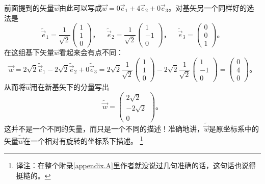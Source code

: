 前面提到的矢量$\vec{w}$由此可以写成$\vec{w}= 0\vec{e}_1 + 4\vec{e}_2 + 0\vec{e}_3$。对基矢另一个同样好的选法是
\begin{equation}
\tilde\vec{e}_1 = \frac{1}{\sqrt{2}} \begin{pmatrix}
1 \\ 1 \\ 0
\end{pmatrix}\text{，}\quad
\tilde\vec{e}_2 = \frac{1}{\sqrt{2}} \begin{pmatrix}
1 \\ -1 \\ 0
\end{pmatrix} \text{，}\quad
\tilde\vec{e}_3 = \begin{pmatrix}
0 \\ 0 \\ 1
\end{pmatrix}\text{。}
\end{equation}
在这组基下矢量$\vec{w}$看起来会有点不同：
\begin{equation}
\vec{w}= 2\sqrt{2}\tilde\vec{e}_1 -2\sqrt{2}\tilde\vec{e}_2 + 0\tilde\vec{e}_3
= 2\sqrt{2} \frac{1}{\sqrt{2}} \begin{pmatrix}
1 \\ 1 \\ 0
\end{pmatrix}-2\sqrt{2}
\frac{1}{\sqrt{2}} \begin{pmatrix}
1 \\ -1 \\ 0
\end{pmatrix} =\begin{pmatrix}
0\\4\\0
\end{pmatrix} \text{。}
\end{equation}
从而将$\vec{w}$用在新基矢下的分量写出
\[
\tilde\vec{w} = \begin{pmatrix}
2\sqrt{2} \\ -2\sqrt{2} \\ 0
\end{pmatrix}\text{。}
\]
这并不是一个不同的矢量，而只是一个不同的描述！准确地讲，$\tilde\vec{w}$是原坐标系中的矢量$\tilde\vec{w}$在一个相对有旋转的坐标系下描述。%
\footnote{译注：在整个附录\ref{appendix.A}里作者就没说过几句准确的话，这句话也说得挺糙的。}

